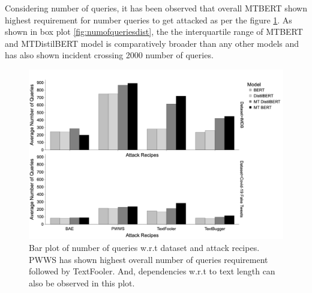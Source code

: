 \documentclass[%
	BCOR=8mm, %
	DIV=12,
	toc=bibliography, %
	toc=listof, %
	oneside, %
	egregdoesnotlikesansseriftitles, %
	]{scrbook}
\begin{document}
Considering number of queries, it has been observed that overall MTBERT shown highest requirement for number queries to get attacked as per the figure \ref{fig:avgnquebyattackrecipes}. As shown in box plot \ref{fig:numofqueriesdist}, the the interquartile range of MTBERT and MTDistilBERT model is comparatively broader than any other models and has also shown incident crossing 2000 number of queries. \\

\begin{figure}[H]
	\centering
    \includegraphics[width=.8\linewidth]{img/AvgNQuebyDataset}
	\caption[Bar plot of number of queries]{Bar plot of number of queries w.r.t dataset and attack recipes. PWWS has shown highest overall number of queries requirement followed by TextFooler.  And, dependencies w.r.t to text length can also be observed in this plot.}
	\label{fig:avgnquebyattackrecipes}
\end{figure}
\end{document}
